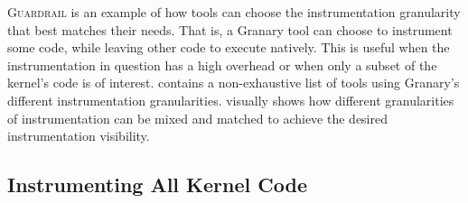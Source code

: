 \documentclass[preprint]{sigplanconf}
\newcommand{\toolname}[1]{{\scshape #1}}
\begin{document}




\toolname{Guardrail} is an example of how tools can choose the instrumentation granularity that best matches their needs. That is, a Granary tool can choose to instrument some code, while leaving other code to execute natively. This is useful when the instrumentation in question has a high overhead or when only a subset of the kernel's code is of interest.  contains a non-exhaustive list of tools using Granary's different instrumentation granularities.  visually shows how different granularities of instrumentation can be mixed and matched to achieve the desired instrumentation visibility.


\subsection{Instrumenting All Kernel Code}
\end{document}
